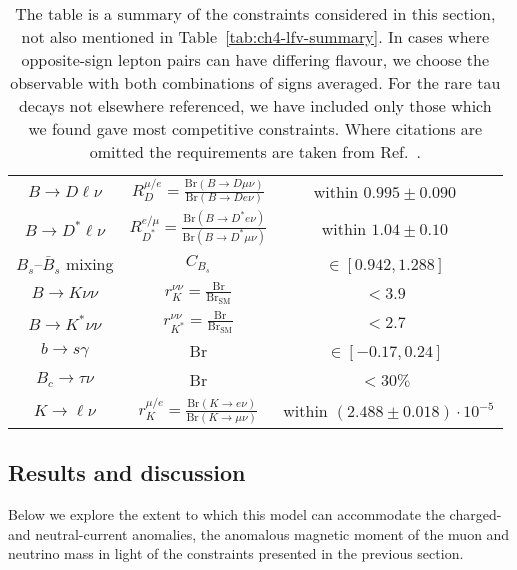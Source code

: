 \begin{table}
\begin{tabular}{ccc}
    $B \to D \ell \nu$               &  $R_{D}^{\mu / e} = \frac{\text{Br}(B \to D \mu \nu)}{\text{Br}(B \to D e \nu)}$  & within $0.995 \pm 0.090$~\cite{Glattauer:2015teq} \\
    $B \to D^* \ell \nu$             &  $R_{D^*}^{e / \mu} = \frac{\text{Br}(B \to D^* e \nu)}{\text{Br}(B \to D^* \mu \nu)}$  & within $1.04 \pm 0.10$~\cite{Abdesselam:2017kjf} \\
    $B_s$--$\bar{B}_s$ mixing        &  $C_{B_s}$  & $\in [0.942, 1.288]$~\cite{Bona:2007vi} \\
    $B \to K \nu \nu$                 &  $r_K^{\nu\nu} = \frac{\text{Br}}{\text{Br}_{\text{SM}}}$ & $< 3.9$~\cite{Grygier:2017tzo} \\
    $B \to K^* \nu \nu$                 &  $r_{K^*}^{\nu\nu} = \frac{\text{Br}}{\text{Br}_{\text{SM}}}$ & $< 2.7$~\cite{Grygier:2017tzo}\\
    $b \to s \gamma$                 &  Br & $\in [-0.17, 0.24]$~\cite{Amhis:2014hma} \\
    $B_c \to \tau \nu$                 &  Br & $< 30 \%$~\cite{Alonso:2016oyd} \\
    $K \to \ell \nu$                 &  $r_K^{\mu/e} = \frac{\text{Br}(K \to e \nu)}{\text{Br}(K \to \mu \nu)}$  & within $(2.488 \pm 0.018) \cdot 10^{-5}$\\
    \bottomrule
  \end{tabular}
  \caption[The table is a summary of the constraints considered in this section,
  not also mentioned in Table~\ref{tab:ch4-lfv-summary}.]{The table is a summary
    of the constraints considered in this section, not also mentioned in
    Table~\ref{tab:ch4-lfv-summary}. In cases where opposite-sign lepton pairs
    can have differing flavour, we choose the observable with both combinations
    of signs averaged. For the rare tau decays not elsewhere referenced, we have
    included only those which we found gave most competitive constraints. Where
    citations are omitted the requirements are taken from
    Ref.~\cite{Olive:2016xmw}.}
  \label{tab:ch4-summary}
\end{table}

\subsection{Results and discussion}
\label{sec:ch4-innes-results-and-disc}

Below we explore the extent to which this model can accommodate the charged- and
neutral-current anomalies, the anomalous magnetic moment of the muon and
neutrino mass in light of the constraints presented in the previous section.

